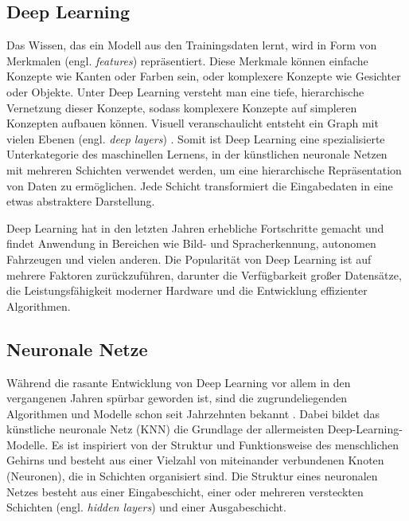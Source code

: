 \subsection{Deep Learning}

Das Wissen, das ein Modell aus den Trainingsdaten lernt, wird in Form von Merkmalen (engl. \textit{features}) repräsentiert. Diese Merkmale können einfache Konzepte wie Kanten oder Farben sein, oder komplexere Konzepte wie Gesichter oder Objekte. Unter Deep Learning versteht man eine tiefe, hierarchische Vernetzung dieser Konzepte, sodass komplexere Konzepte auf simpleren Konzepten aufbauen können. Visuell veranschaulicht entsteht ein Graph mit vielen Ebenen (engl. \textit{deep layers}) \cite{}. Somit ist Deep Learning eine spezialisierte Unterkategorie des maschinellen Lernens, in der künstlichen neuronale Netzen mit mehreren Schichten verwendet werden, um eine hierarchische Repräsentation von Daten zu ermöglichen. Jede Schicht transformiert die Eingabedaten in eine etwas abstraktere Darstellung.

Deep Learning hat in den letzten Jahren erhebliche Fortschritte gemacht und findet Anwendung in Bereichen wie Bild- und Spracherkennung, autonomen Fahrzeugen und vielen anderen. Die Popularität von Deep Learning ist auf mehrere Faktoren zurückzuführen, darunter die Verfügbarkeit großer Datensätze, die Leistungsfähigkeit moderner Hardware und die Entwicklung effizienter Algorithmen. \cite{}

\subsection{Neuronale Netze}

Während die rasante Entwicklung von Deep Learning vor allem in den vergangenen Jahren spürbar geworden ist, sind die zugrundeliegenden Algorithmen und Modelle schon seit Jahrzehnten bekannt \cite{}. Dabei bildet das künstliche neuronale Netz (KNN) die Grundlage der allermeisten Deep-Learning-Modelle. Es ist inspiriert von der Struktur und Funktionsweise des menschlichen Gehirns und besteht aus einer Vielzahl von miteinander verbundenen Knoten (Neuronen), die in Schichten organisiert sind. Die Struktur eines neuronalen Netzes besteht aus einer Eingabeschicht, einer oder mehreren versteckten Schichten (engl. \textit{hidden layers}) und einer Ausgabeschicht.

